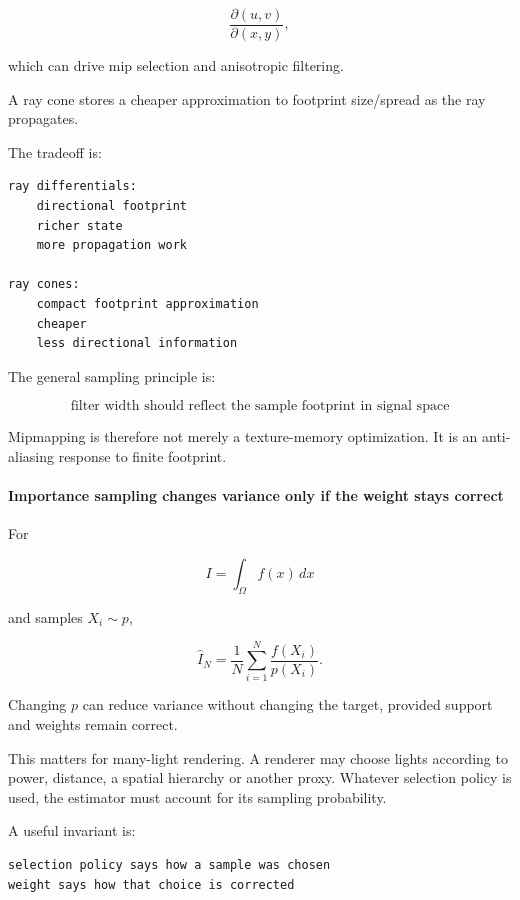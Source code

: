 \[
\frac{\partial(u,v)}{\partial(x,y)},
\]

which can drive mip selection and anisotropic filtering.

A ray cone stores a cheaper approximation to footprint size/spread as the ray propagates.

The tradeoff is:

\begin{verbatim}
ray differentials:
    directional footprint
    richer state
    more propagation work

ray cones:
    compact footprint approximation
    cheaper
    less directional information
\end{verbatim}

The general sampling principle is:

\[
\boxed{
\text{filter width should reflect the sample footprint in signal space}
}
\]

Mipmapping is therefore not merely a texture-memory optimization. It is an anti-aliasing response to finite footprint.

\paragraph{Importance sampling changes variance only if the weight stays correct}\label{03-visual-computing-i-ch001-importance-sampling-changes-variance-only-if-the-weight-stays-correct}

\hypertarget{03-visual-computing-i-ch001-importance-sampling-changes-variance-only-if-the-weight-stays-correct}{}

For

\[
I=\int_\Omega f(x)\,dx
\]

and samples \(X_i\sim p\),

\[
\widehat I_N=
\frac1N
\sum_{i=1}^{N}
\frac{f(X_i)}{p(X_i)}.
\]

Changing \(p\) can reduce variance without changing the target, provided support and weights remain correct.

This matters for many-light rendering. A renderer may choose lights according to power, distance, a spatial hierarchy or another proxy. Whatever selection policy is used, the estimator must account for its sampling probability.

A useful invariant is:

\begin{verbatim}
selection policy says how a sample was chosen
weight says how that choice is corrected
\end{verbatim}

